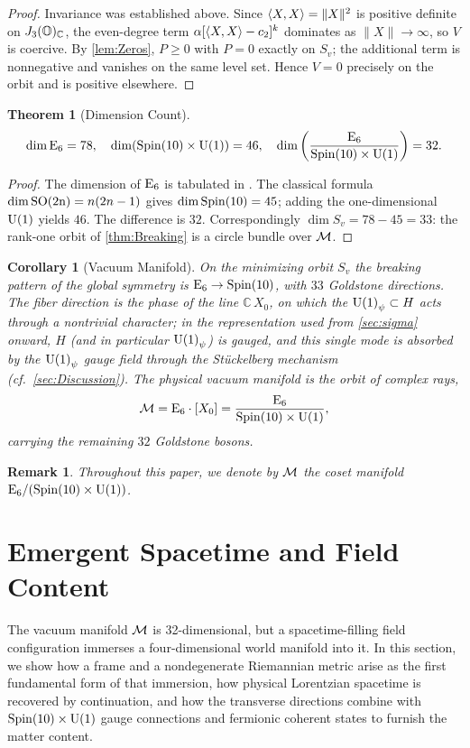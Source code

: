 \documentclass[pdflatex,sn-mathphys-num]{sn-jnl}
\theoremstyle{thmstyleone}
\newtheorem{theorem}{Theorem}
\newtheorem{corollary}[corollary]{Corollary}
\theoremstyle{thmstylethree}%
\theoremstyle{thmstyletwo}%
\newtheorem{remark}[remark]{Remark}
\begin{document}
\begin{proof}
Invariance was established above. Since $\langle X,X\rangle=\|X\|^{2}$ is positive
definite on $J_3(\mathbb{O})_{\mathbb C}$, the even-degree term
$\alpha[\langle X,X\rangle-c_{2}]^{k}$ dominates as $\|X\|\to\infty$, so $V$ is
coercive. By \autoref{lem:Zeros}, $P\ge0$ with $P=0$ exactly on
$S_{v}$; the additional term is nonnegative and vanishes on the same
level set. Hence $V=0$ precisely on the orbit and is positive elsewhere.
\end{proof}

\begin{theorem}[Dimension Count]\label{thm:DimCount}
\[
  \dim \mathrm{E}_{6}=78,
  \quad
  \dim (\operatorname{Spin}(10) \times \mathrm{U(1)})=46,
  \quad
  \dim \left(\frac{\mathrm{E}_{6}}{\operatorname{Spin}(10) \times \mathrm{U(1)}}\right)=32.
\]
\end{theorem}

\begin{proof}
The dimension of $\mathrm{E}_{6}$ is tabulated in \cite{Slansky:1981}.  The
classical formula $\dim \mathrm{SO(2n)}=n(2n-1)$ gives
$\dim \operatorname{Spin}(10)=45$; adding the one-dimensional $\mathrm{U(1)}$ yields $46$.  The
difference is $32$. Correspondingly $\dim S_{v}=78-45=33$: the rank-one orbit
of \autoref{thm:Breaking} is a circle bundle over $\mathcal{M}$.
\end{proof}

\begin{corollary}[Vacuum Manifold]\label{cor:VacuumManifold}
On the minimizing orbit $S_{v}$ the breaking pattern of the global symmetry is
$\mathrm{E}_{6}\to\operatorname{Spin}(10)$, with $33$ Goldstone directions. The fiber direction is
the phase of the line $\mathbb C\,X_{0}$, on which the $\mathrm{U(1)}_\psi\subset H$
acts through a nontrivial character; in the representation used from
\autoref{sec:sigma} onward, $H$ (and in particular $\mathrm{U(1)}_\psi$) is gauged,
and this single mode is absorbed by the $\mathrm{U(1)}_\psi$ gauge field through the
St\"uckelberg mechanism (cf.\ \autoref{sec:Discussion}). The physical vacuum
manifold is the orbit of complex rays,
\[
  \mathcal M
  =\mathrm{E}_{6}\cdot[X_{0}]
  =\frac{\mathrm{E}_{6}}{\operatorname{Spin}(10) \times \mathrm{U(1)}},
\]
carrying the remaining $32$ Goldstone bosons.
\end{corollary}

\begin{remark}
Throughout this paper, we denote by $\mathcal{M}$ the coset manifold $\mathrm{E}_{6}/(\operatorname{Spin}(10) \times \mathrm{U(1)})$.
\end{remark}

\section{Emergent Spacetime and Field Content}
\label{sec:EmergentFields}
The vacuum manifold $\mathcal{M}$ is 32-dimensional, but a spacetime-filling field
configuration immerses a four-dimensional world manifold into it. In this
section, we show how a frame and a nondegenerate Riemannian metric arise as the
first fundamental form of that immersion, how physical Lorentzian spacetime is
recovered by continuation, and how the transverse directions combine with
$\operatorname{Spin}(10) \times \mathrm{U(1)}$ gauge connections and fermionic coherent states to furnish the
matter content.
\end{document}
